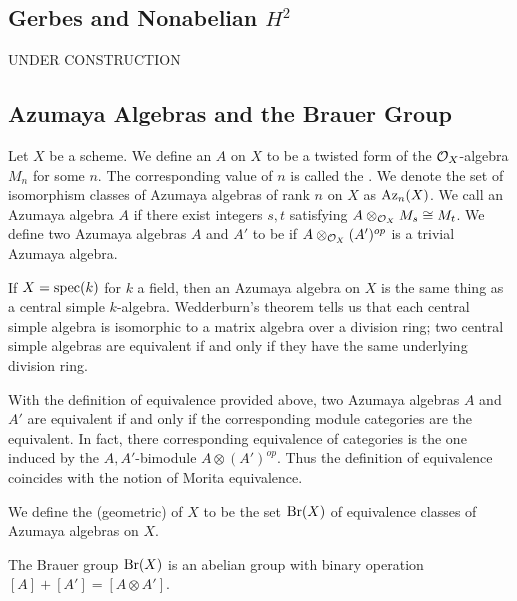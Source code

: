 \subsection{Gerbes and Nonabelian $H^2$}
UNDER CONSTRUCTION

\subsection{Azumaya Algebras and the Brauer Group}
\begin{defn}
Let $X$ be a scheme.  We define an  $A$ on $X$ to be a twisted form of the $\mathcal{O}_X$-algebra $M_n$ for some $n$.  The corresponding value of $n$ is called the .  We denote the set of isomorphism classes of Azumaya algebras of rank $n$ on $X$ as $\textnormal{Az}_n(X)$.  We call an Azumaya algebra $A$  if there exist integers $s,t$ satisfying $A\otimes_{\mathcal{O}_X} M_s \cong M_t$.  We define two Azumaya algebras $A$ and $A'$ to be  if $A\otimes_{\mathcal{O}_X}(A')^{op}$ is a trivial Azumaya algebra.
\end{defn}

\begin{ex}
If $X = \textnormal{spec}(k)$ for $k$ a field, then an Azumaya algebra on $X$ is the same thing as a central simple $k$-algebra.  Wedderburn's theorem tells us that each central simple algebra is isomorphic to a matrix algebra over a division ring; two central simple algebras are equivalent if and only if they have the same underlying division ring.
\end{ex}

\begin{remk}
With the definition of equivalence provided above, two Azumaya algebras $A$ and $A'$ are equivalent if and only if the corresponding module categories are the equivalent.  In fact, there corresponding equivalence of categories is the one induced by the $A,A'$-bimodule $A\otimes(A')^{op}$.  Thus the definition of equivalence coincides with the notion of Morita equivalence.
\end{remk}

\begin{defn}
We define the (geometric)  of $X$ to be the set $\textnormal{Br}(X)$ of equivalence classes of Azumaya algebras on $X$.
\end{defn}

\begin{prop}
The Brauer group $\textnormal{Br}(X)$ is an abelian group with binary operation $[A]+[A'] = [A\otimes A']$.
\end{prop}


